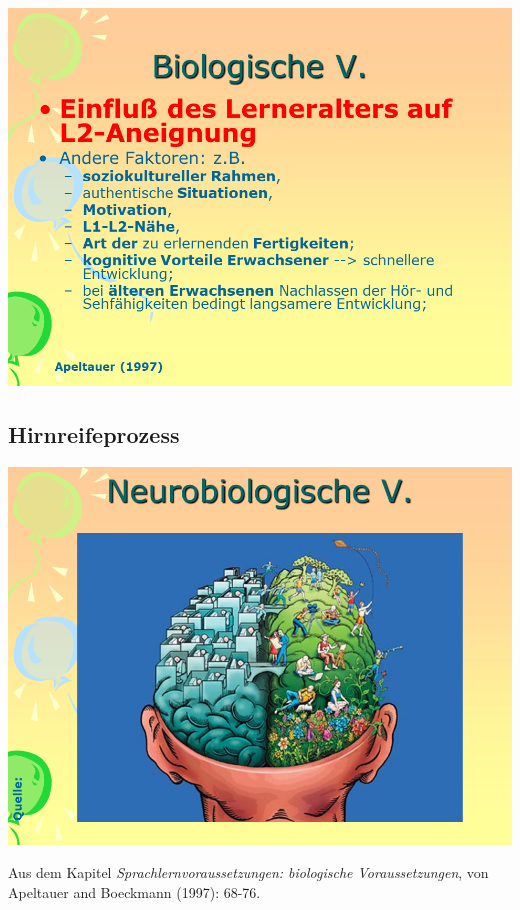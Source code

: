 \documentclass[
  letterpaper,
]{scrbook}
\begin{document}
\includegraphics[width=1\textwidth,height=\textheight]{./pictures/neuro/Diapozitiv84.PNG}

\hypertarget{hirnreifeprozess}{%
\subsection{Hirnreifeprozess}\label{hirnreifeprozess}}

\includegraphics[width=1\textwidth,height=\textheight]{./pictures/neuro/Diapozitiv86.PNG}

Aus dem Kapitel \emph{Sprachlernvoraussetzungen: biologische
Voraussetzungen}, von Apeltauer and Boeckmann (1997): 68-76.
\end{document}
